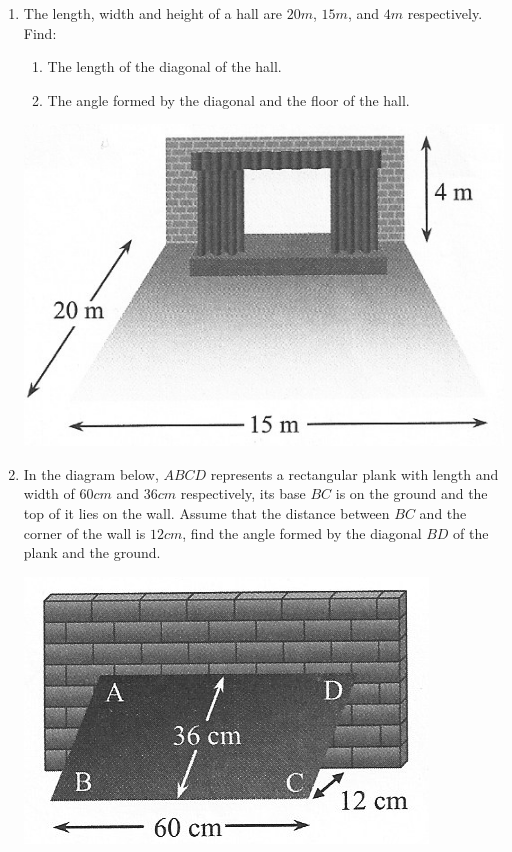 \documentclass{report}
\begin{document}
\begin{multicols}{2}
\begin{enumerate}
\begin{center}
              \end{center}
        \item The length, width and height of a hall are $20m$, $15m$, and $4m$ respectively.
              Find:
              \begin{enumerate}
                  \item The length of the diagonal of the hall.
                  \item The angle formed by the diagonal and the floor of the hall.
              \end{enumerate}
              \begin{center}
                  \includegraphics[scale=0.9]{hall}
              \end{center}
        \item In the diagram below, $ABCD$ represents a rectangular plank with length and
              width of $60cm$ and $36cm$ respectively, its base $BC$ is on the ground and the
              top of it lies on the wall. Assume that the distance between $BC$ and the
              corner of the wall is $12cm$, find the angle formed by the diagonal $BD$ of the
              plank and the ground.
              \begin{center}
                  \includegraphics[scale=0.9]{wall}
              \end{center}
    \end{enumerate}


\end{multicols}
\end{document}

